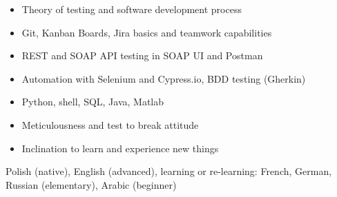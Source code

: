 \documentclass[a4paper,12pt]{memoir} %
\begin{document}
{\begin{itemize}
    \item[\bluebullet] Theory of testing and software development process
    \item[\bluebullet] Git, Kanban Boards, Jira basics and teamwork capabilities
    \item[\bluebullet] REST and SOAP API testing in SOAP UI and Postman
    \item[\bluebullet] Automation with Selenium and Cypress.io, BDD testing
            (Gherkin)
    \item[\bluebullet] Python, shell, SQL, Java, Matlab
    \item[\bluebullet] Meticulousness and test to break attitude
    \item[\bluebullet] Inclination to learn and experience new things
\end{itemize}}
%
%
%
{Polish (native), English (advanced), learning or re-learning: French, German,
Russian (elementary), Arabic (beginner)}
% 
\Sep %
\end{document}
